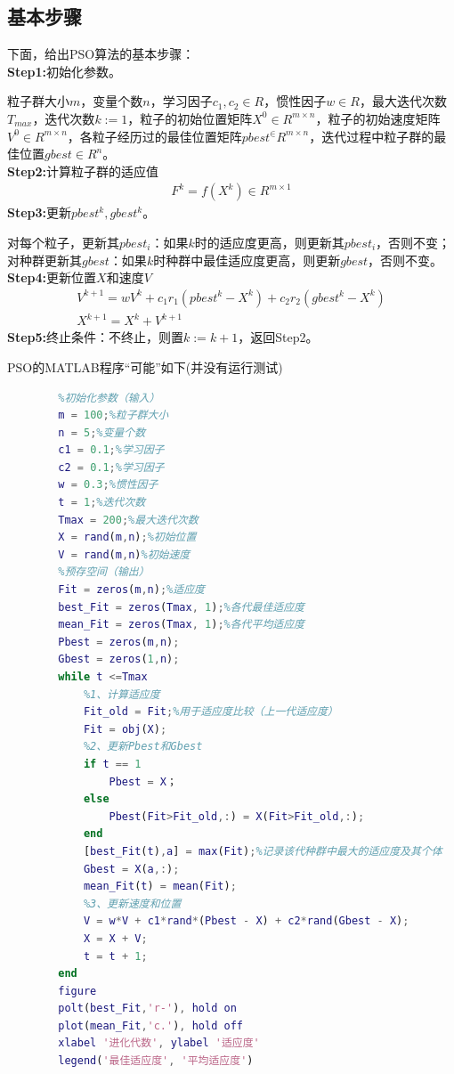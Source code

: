     \subsection{基本步骤}
        \par
        下面，给出PSO算法的基本步骤：\\
        \textbf{Step1:}初始化参数。
        \par
        粒子群大小$m$，变量个数$n$，学习因子$c_1,c_2\in R$，惯性因子$w\in R$，最大迭代次数$T_{max}$，迭代次数$k:=1$，粒子的初始位置矩阵$X^0\in R^{m\times n}$，粒子的初始速度矩阵$V^0\in R^{m\times n}$，各粒子经历过的最佳位置矩阵$pbest^\in R^{m\times n}$，迭代过程中粒子群的最佳位置$gbest\in R^n$。\\
        \textbf{Step2:}计算粒子群的适应值
        \begin{align*}
        F^k = f(X^k)\in R^{m\times 1}
        \end{align*}
        \textbf{Step3:}更新$pbest^k,gbest^k$。
        \par
        对每个粒子，更新其$pbest_i$：如果$k$时的适应度更高，则更新其$pbest_i$，否则不变；对种群更新其$gbest$：如果$k$时种群中最佳适应度更高，则更新$gbest$，否则不变。\\
        \textbf{Step4:}更新位置$X$和速度$V$
        \begin{align*}
        V^{k+1} = w V^k + c_1r_1(pbest^k-X^k)+c_2r_2(gbest^k-X^k)\\
        X^{k+1} = X^k+V^{k+1}
        \end{align*}
        \textbf{Step5:}终止条件：不终止，则置$k:=k+1$，返回Step2。
        \par
        PSO的MATLAB程序“可能”如下(并没有运行测试)
        \begin{lstlisting}[language = Matlab]
        %%基本的粒子群算法PSO
        %初始化参数（输入）
        m = 100;%粒子群大小
        n = 5;%变量个数
        c1 = 0.1;%学习因子
        c2 = 0.1;%学习因子
        w = 0.3;%惯性因子
        t = 1;%迭代次数
        Tmax = 200;%最大迭代次数
        X = rand(m,n);%初始位置
        V = rand(m,n)%初始速度
        %预存空间（输出）
        Fit = zeros(m,n);%适应度
        best_Fit = zeros(Tmax, 1);%各代最佳适应度
        mean_Fit = zeros(Tmax, 1);%各代平均适应度
        Pbest = zeros(m,n);
        Gbest = zeros(1,n);
        while t <=Tmax
            %1、计算适应度
            Fit_old = Fit;%用于适应度比较（上一代适应度）
            Fit = obj(X);
            %2、更新Pbest和Gbest
            if t == 1
                Pbest = X；
            else
                Pbest(Fit>Fit_old,:) = X(Fit>Fit_old,:);
            end
            [best_Fit(t),a] = max(Fit);%记录该代种群中最大的适应度及其个体
            Gbest = X(a,:);
            mean_Fit(t) = mean(Fit);
            %3、更新速度和位置
            V = w*V + c1*rand*(Pbest - X) + c2*rand(Gbest - X);
            X = X + V;
            t = t + 1;
        end
        figure
        polt(best_Fit,'r-'), hold on
        plot(mean_Fit,'c.'), hold off
        xlabel '进化代数', ylabel '适应度'
        legend('最佳适应度', '平均适应度')
        \end{lstlisting}
